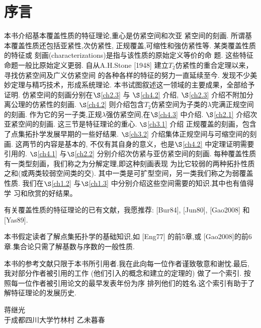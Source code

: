 \chapter*{序\quad 言}

\setcounter{page}{1}
\thispagestyle{empty}

本书介绍基本覆盖性质的特征理论,重心是仿紧空间和次亚
紧空间的刻画.
所谓基本覆盖性质还包括亚紧性,次仿紧性,
正规覆盖,可缩性和強仿紧性等.
某类覆盖性质的特征或
刻画(characterizations)是指与该性质的原始定义等价的命
题.
这些特征命题一般比原始定义更弱.
自从A.H.Stone [1948]
建立$T_2$仿紧性的重合定理以来，寻找仿紧空间及广义仿紧空间
的各种各样的特征的努力一直延续至今.
发现不少美妙定理与精巧技术，形成系统理论.
本书试图叙述这一领域的主要成果，全部给予证明.
仿紧空间的刻画分别在$\S$\ref{ch2.3} 与
$\S$\ref{ch4.2} 介绍, $\S$\ref{ch2.3} 介绍不附加分离公理的仿紧性的刻画.
$\S$\ref{ch4.2} 则介绍包含$T_2$仿紧空间为子类的$\lambda$完满正规空间的刻画.
作为它的另一子类,正规$\lambda$强仿紧空间,在$\S$\ref{ch4.3} 中介绍.
$\S$\ref{ch2.1} 介绍次亚紧空间的刻画.
这三节是特征理论的重心. $\S$\ref{ch3.1} 介绍
正规覆盖的刻画，包含了点集拓扑学发展早期的一些好结果.
$\S$\ref{ch3.2} 介绍集体正规空间与可缩空间的刻画.
这两节的内容是基本的, 不仅有其自身的意义，也是$\S$\ref{ch4.2} 中定理证明需要引用的.
$\S$\ref{ch4.1} 与$\S$\ref{ch2.2} 分别介绍次仿紧与亚仿紧空间的刻画.
每种覆盖性质有一类型刻画，我们称之为分解定理,即这种刻画表现
为比它较弱的两种拓扑性质之和(或两类较弱空间类的交).
其中一类是可扩型空间，另一类我们称之为弱覆盖性质.
我们在$\S$\ref{ch1.2} 与$\S$\ref{ch1.3} 中分别介绍这些空间需要的知识.其中也有值得学
习和欣赏的好结果。

有关覆盖性质的特征理论的已有文献，我愿推荐: [Bur84], [Jun80], [Gao2008] 和 [Yas89].

本书假定读者了解点集拓扑学的基础知识,如 [Eng77] 的前5章,或
[Gao2008]的前6章.集合论只需了解基数与序数的一般性质.

本书的参考文献只限于本书所引用者.我在此向每一位作者谨致敬意和谢忱.最后, 我对部分作者被引用的工作 (他们引入的概念和建立的定理的) 做了一个索引.
按照每一位作者被引用论文的最早发表年份为序
排列他们的姓名.这个索引有助于了解特征理论的发展历史.

{\kaishu
	\begin{center}
		\hspace*{88mm}蒋继光\\
		\hspace{88mm}于成都四川大学竹林村
		\hspace*{88mm}乙未暮春
	\end{center}
}



